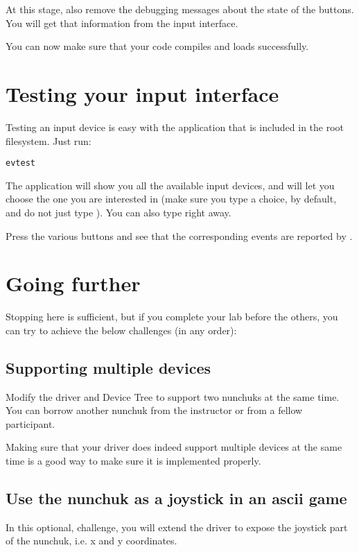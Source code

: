 At this stage, also remove the debugging messages about the state
of the buttons. You will get that information from the input interface.

You can now make sure that your code compiles and loads successfully.

\section{Testing your input interface}

Testing an input device is easy with the  application
that is included in the root filesystem. Just run:

\begin{verbatim}
evtest
\end{verbatim}

The application will show you all the available input devices, and will let
you choose the one you are interested in (make sure you type a choice,
 by default, and do not just type \code{[Enter]}). You can also
type  right away.

Press the various buttons and see that the corresponding events are
reported by .

\section{Going further}

Stopping here is sufficient, but if you complete your lab before the
others, you can try to achieve the below challenges (in any order):

\subsection{Supporting multiple devices}

Modify the driver and Device Tree to support two nunchuks at the same
time. You can borrow another nunchuk from the instructor or from a fellow
participant.

Making sure that your driver does indeed support multiple devices at the
same time is a good way to make sure it is implemented properly.

\subsection{Use the nunchuk as a joystick in an ascii game}

In this optional, challenge, you will extend the driver to expose
the joystick part of the nunchuk, i.e. x and y coordinates.

